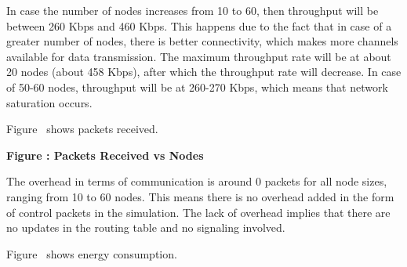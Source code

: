 \documentclass[a4paper,fleqn]{cas-dc}
\numberwithin{equation}{section}
\begin{document}
In case the number of nodes increases from 10 to 60, then throughput will be between 260 Kbps and 460 Kbps. This happens due to the fact that in case of a greater number of nodes, there is better connectivity, which makes more channels available for data transmission. The maximum throughput rate will be at about 20 nodes (about 458 Kbps), after which the throughput rate will decrease. In case of 50-60 nodes, throughput will be at 260-270 Kbps, which means that network saturation occurs.
\vspace{0.5cm}

\noindent Figure \thefigure\ shows packets received.

\begin{center}

\textbf{Figure \thefigure: Packets Received vs Nodes}
\label{fig:packets_density}
\end{center}

The overhead in terms of communication is around 0 packets for all node sizes, ranging from 10 to 60 nodes. This means there is no overhead added in the form of control packets in the simulation. The lack of overhead implies that there are no updates in the routing table and no signaling involved.

\vspace{0.5cm}

\noindent Figure \thefigure\ shows energy consumption.
\end{document}
